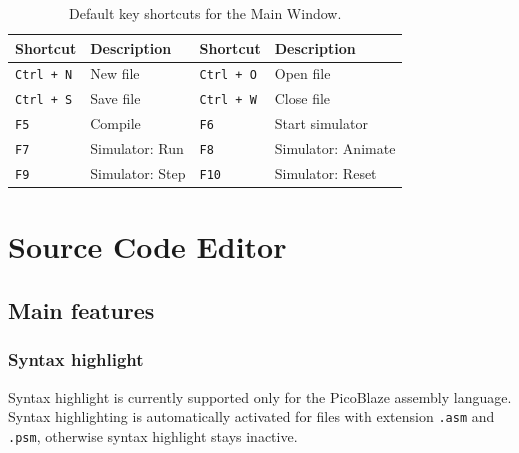             \begin{table}[h!]
                \centering
                \fontsize{8pt}{9pt}
                {
                    \begin{tabular}{|l|l|l|l|}
                        \hline
                        \textbf{Shortcut}               & \textbf{Description}          &
                        \textbf{Shortcut}               & \textbf{Description}          \\\hline
                        \texttt{Ctrl + N}               & New file                      &
                        \texttt{Ctrl + O}               & Open file                     \\
                        \texttt{Ctrl + S}               & Save file                     &
                        \texttt{Ctrl + W}               & Close file                    \\
                        \texttt{F5}                     & Compile                       &
                        \texttt{F6}                     & Start simulator               \\
                        \texttt{F7}                     & Simulator: Run                &
                        \texttt{F8}                     & Simulator: Animate            \\
                        \texttt{F9}                     & Simulator: Step               &
                        \texttt{F10}                    & Simulator: Reset              \\
                        \hline
                    \end{tabular}
                }
                \caption{Default key shortcuts for the Main Window.}
            \end{table}

\clearpage
\section{Source Code Editor}
    \subsection{Main features}
        \subsubsection{Syntax highlight}
            Syntax highlight is currently supported only for the PicoBlaze assembly language. Syntax highlighting is automatically activated for files with extension \texttt{.asm} and \texttt{.psm}, otherwise syntax highlight stays inactive.

